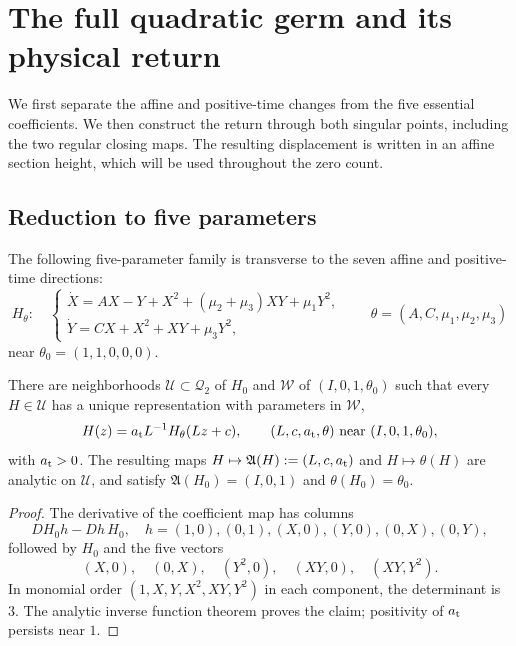 \section{The full quadratic germ and its physical return}
\label{sec:normalization}

We first separate the affine and positive-time changes from the five
essential coefficients. We then construct the return through both
singular points, including the two regular closing maps. The resulting
displacement is written in an affine section height, which will be used
throughout the zero count.

\subsection{Reduction to five parameters}

The following five-parameter family is transverse to the seven affine
and positive-time directions:
\begin{equation}\label{eq:slice}
 H_\theta:\quad
 \begin{cases}
 \dot X=AX-Y+X^2+(\mu_2+\mu_3)XY+\mu_1Y^2,\\
 \dot Y=CX+X^2+XY+\mu_3Y^2,
 \end{cases}\qquad
 \theta=(A,C,\mu_1,\mu_2,\mu_3)
\end{equation}
near \(\theta_0=(1,1,0,0,0)\).

\begin{lemma}\label{lem:slice}
There are neighborhoods \(\mathcal U\subset\mathcal Q_2\) of \(H_0\) and
\(\mathcal W\) of \((I,0,1,\theta_0)\) such that every
\(H\in\mathcal U\) has a unique representation with parameters in
\(\mathcal W\),
\begin{equation}\label{eq:affine-action}
 H(z)=a_{\rm t}L^{-1}H_\theta(Lz+c),
 \qquad (L,c,a_{\rm t},\theta)\ \hbox{near }(I,0,1,\theta_0),
\end{equation}
with \(a_{\rm t}>0\).  The resulting maps
\(H\mapsto \mathfrak A(H):=(L,c,a_{\rm t})\) and
\(H\mapsto\theta(H)\) are
analytic on \(\mathcal U\), and satisfy
\(\mathfrak A(H_0)=(I,0,1)\) and \(\theta(H_0)=\theta_0\).
\end{lemma}
\begin{proof}
The derivative of the coefficient map has columns
\[
 DH_0h-Dh\,H_0,\quad
 h=(1,0),(0,1),(X,0),(Y,0),(0,X),(0,Y),
\]
followed by \(H_0\) and the five vectors
\[
 (X,0),\quad(0,X),\quad(Y^2,0),\quad(XY,0),\quad(XY,Y^2).
\]
In monomial order \((1,X,Y,X^2,XY,Y^2)\) in each component,
the determinant is \(3\). The analytic inverse function theorem
proves the claim; positivity of \(a_{\rm t}\) persists near \(1\).
\end{proof}

